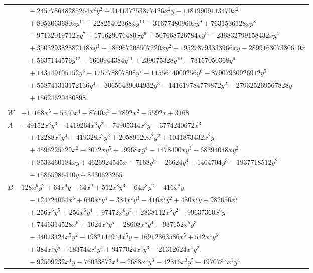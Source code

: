 \documentclass[11pt]{article}
\begin{document}
\begin{longtable}{@{}ll@{}}
 & $\quad -245778648285264x^{2}y^{2}+314137253877426x^{2}y-11819909113470x^{2}$\\
 & $\quad +8053063680xy^{11}+22825402368xy^{10}-31677480960xy^{9}+7631536128xy^{8}$\\
 & $\quad -97132019712xy^{7}+171629076480xy^{6}+507668726784xy^{5}-236832799158432xy^{4}$\\
 & $\quad +350329382882148xy^{3}+186967208507220xy^{2}+195278793333966xy-289916307380610x$\\
 & $\quad +5637144576y^{12}-1660944384y^{11}+239075328y^{10}-73157050368y^{9}$\\
 & $\quad +143149105152y^{8}-175778807808y^{7}-1155644000256y^{6}-87907930926912y^{5}$\\
 & $\quad +558741313172136y^{4}-30656439004932y^{3}-141619784779872y^{2}-279325269567828y$\\
 & $\quad +15624620480898$\\
\addlinespace[3pt]
\multicolumn{2}{@{}l}{$i=18$, $m=1$, neighbours $45,1,3,5,10,12,19,21,26,37$}\\
$W$ & $-11168x^{5}-5540x^{4}-8740x^{3}-7892x^{2}-5592x+3168$\\
$A$ & $-49152x^{3}y^{3}-1419264x^{3}y^{2}-74905344x^{3}y-3774240672x^{3}$\\
 & $\quad +12288x^{2}y^{4}+419328x^{2}y^{3}+20589120x^{2}y^{2}+1041873432x^{2}y$\\
 & $\quad +4596225729x^{2}-3072xy^{5}+19968xy^{4}-1478400xy^{3}-68394048xy^{2}$\\
 & $\quad +8533460184xy+4626924545x-7168y^{5}-26624y^{4}+1464704y^{3}-1937718512y^{2}$\\
 & $\quad -15865986410y+8430623265$\\
$B$ & $128x^{9}y^{2}+64x^{9}y-64x^{9}+512x^{8}y^{3}-64x^{8}y^{2}-416x^{8}y$\\
 & $\quad -124724064x^{8}+640x^{7}y^{4}-384x^{7}y^{3}-416x^{7}y^{2}+480x^{7}y+982656x^{7}$\\
 & $\quad +256x^{6}y^{5}+256x^{6}y^{4}+97472x^{6}y^{3}+2838112x^{6}y^{2}-99637360x^{6}y$\\
 & $\quad +7446314528x^{6}+1024x^{5}y^{5}-28608x^{5}y^{4}-937152x^{5}y^{3}$\\
 & $\quad -44013424x^{5}y^{2}-1982144944x^{5}y-16912863586x^{5}+512x^{4}y^{6}$\\
 & $\quad +384x^{4}y^{5}+183744x^{4}y^{4}+9477024x^{4}y^{3}-21312624x^{4}y^{2}$\\
 & $\quad -92509232x^{4}y-76033872x^{4}-2688x^{3}y^{6}-42816x^{3}y^{5}-1970784x^{3}y^{4}$\\

\end{longtable}
\end{document}
